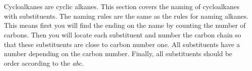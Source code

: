 \documentclass[main.tex]{subfiles}
\begin{document}
\begin{description}
\end{description}




\section{\color{blue!30!black}{Cylcoalkanes with substituyents}}
Cycloalkanes are cyclic alkanes. This section covers the naming of cycloalkanes with substituents. The naming rules are the same as the rules for naming alkanes. This means first you will find the ending on the name by counting the number of carbons. Then you will locate each substituent and number the carbon chain so that these substituents are close to carbon number one. All substituents have a number depending on the carbon number. Finally, all substituents should be order according to the \emph{abc}.
\sloppy
\end{document}
